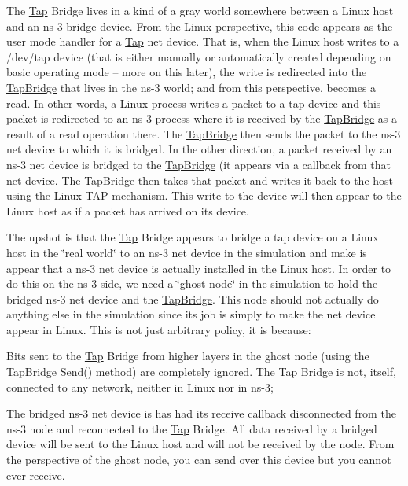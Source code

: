 The \hyperlink{classns3_1_1Tap}{Tap} Bridge lives in a kind of a gray world somewhere between a Linux host and an ns-\/3 bridge device. From the Linux perspective, this code appears as the user mode handler for a \hyperlink{classns3_1_1Tap}{Tap} net device. That is, when the Linux host writes to a /dev/tap device (that is either manually or automatically created depending on basic operating mode -- more on this later), the write is redirected into the \hyperlink{classns3_1_1TapBridge}{Tap\+Bridge} that lives in the ns-\/3 world; and from this perspective, becomes a read. In other words, a Linux process writes a packet to a tap device and this packet is redirected to an ns-\/3 process where it is received by the \hyperlink{classns3_1_1TapBridge}{Tap\+Bridge} as a result of a read operation there. The \hyperlink{classns3_1_1TapBridge}{Tap\+Bridge} then sends the packet to the ns-\/3 net device to which it is bridged. In the other direction, a packet received by an ns-\/3 net device is bridged to the \hyperlink{classns3_1_1TapBridge}{Tap\+Bridge} (it appears via a callback from that net device. The \hyperlink{classns3_1_1TapBridge}{Tap\+Bridge} then takes that packet and writes it back to the host using the Linux T\+AP mechanism. This write to the device will then appear to the Linux host as if a packet has arrived on its device.

The upshot is that the \hyperlink{classns3_1_1Tap}{Tap} Bridge appears to bridge a tap device on a Linux host in the \char`\"{}real world\char`\"{} to an ns-\/3 net device in the simulation and make is appear that a ns-\/3 net device is actually installed in the Linux host. In order to do this on the ns-\/3 side, we need a \char`\"{}ghost
node\char`\"{} in the simulation to hold the bridged ns-\/3 net device and the \hyperlink{classns3_1_1TapBridge}{Tap\+Bridge}. This node should not actually do anything else in the simulation since its job is simply to make the net device appear in Linux. This is not just arbitrary policy, it is because\+:


\begin{DoxyItemize}
\item Bits sent to the \hyperlink{classns3_1_1Tap}{Tap} Bridge from higher layers in the ghost node (using the \hyperlink{classns3_1_1TapBridge}{Tap\+Bridge} \hyperlink{classns3_1_1TapBridge_a3273f1c6353f38dea443e2abad4c3d21}{Send()} method) are completely ignored. The \hyperlink{classns3_1_1Tap}{Tap} Bridge is not, itself, connected to any network, neither in Linux nor in ns-\/3;
\item The bridged ns-\/3 net device is has had its receive callback disconnected from the ns-\/3 node and reconnected to the \hyperlink{classns3_1_1Tap}{Tap} Bridge. All data received by a bridged device will be sent to the Linux host and will not be received by the node. From the perspective of the ghost node, you can send over this device but you cannot ever receive.
\end{DoxyItemize}

